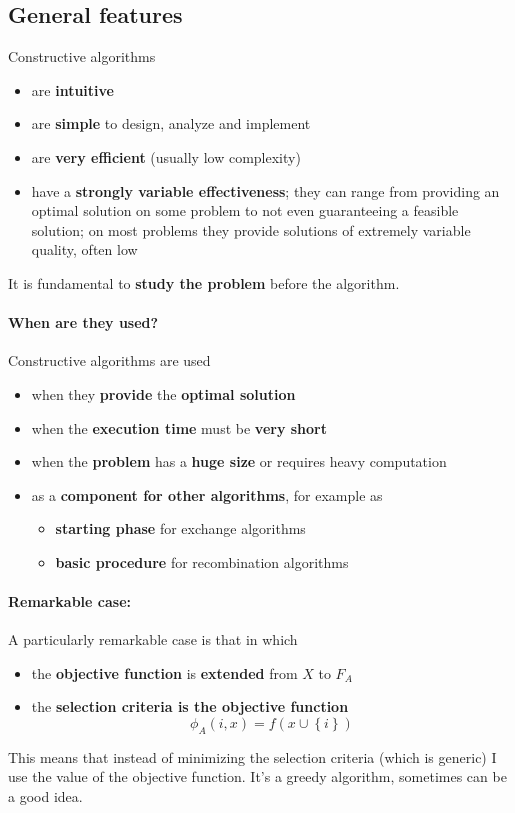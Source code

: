 \newpage

\subsection{General features}
Constructive algorithms
\begin{itemize}
	\item are \textbf{intuitive}
	\item are \textbf{simple} to design, analyze and implement
	\item are \textbf{very efficient} (usually low complexity)
	\item have a \textbf{strongly variable effectiveness}; they can range from providing an optimal solution on some problem to not even guaranteeing a feasible solution; on most problems they provide solutions of extremely variable quality, often low
\end{itemize}
It is fundamental to \textbf{study the problem} before the algorithm.\\

\paragraph{When are they used?} Constructive algorithms are used
\begin{itemize}
	\item when they \textbf{provide} the \textbf{optimal solution}
	\item when the \textbf{execution time} must be \textbf{very short} 
	\item when the \textbf{problem} has a \textbf{huge size} or requires heavy computation 
	\item as a \textbf{component for other algorithms}, for example as
	\begin{itemize}
		\item \textbf{starting phase} for exchange algorithms 
		\item \textbf{basic procedure} for recombination algorithms
	\end{itemize}
\end{itemize}

\paragraph{Remarkable case:} A particularly remarkable case is that in which
\begin{itemize}
	\item the \textbf{objective function} is \textbf{extended} from $X$ to $F_A$
	\item the \textbf{selection criteria is the objective function}
	$$ \phi_A (i,x) = f\left(x \cup \left\{i\right\}\right) $$
\end{itemize}
This means that instead of minimizing the selection criteria (which is generic) I use the value of the objective function. It's a greedy algorithm, sometimes can be a good idea.\\

